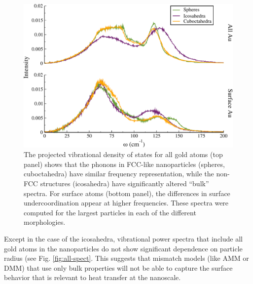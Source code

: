 \begin{figure}
	\includegraphics[width=\linewidth]{figures/all-v-surface.pdf}
	\caption{The projected vibrational density of states for all
          gold atoms (top panel) shows that the phonons in FCC-like
          nanoparticles (spheres, cuboctahedra) have similar frequency
          representation, while the non-FCC structures (icosahedra)
          have significantly altered ``bulk'' spectra. For surface
          atoms (bottom panel), the differences in surface
          undercoordination  appear at higher frequencies.  These
          spectra were computed for the largest particles in each of
          the different morphologies.}
	\label{fig:all-v-surf}
\end{figure}

Except in the case of the icosahedra, vibrational power spectra that
include all gold atoms in the nanoparticles do not show significant
dependence on particle radius (see Fig. \ref{fig:all-spect}.  This
suggests that mismatch models (like AMM or DMM) that use only bulk
properties will not be able to capture the surface behavior that is
relevant to heat transfer at the nanoscale.


